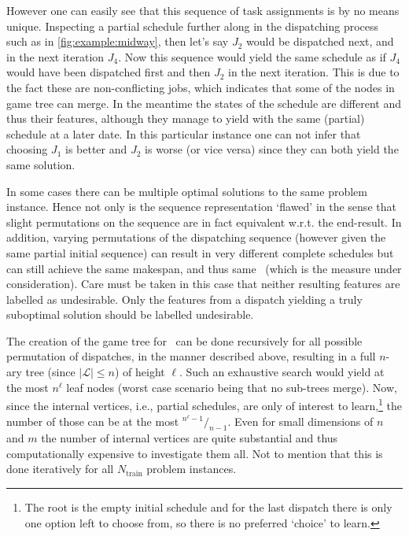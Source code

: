 However one can easily see that this sequence of task assignments is by no 
means unique. 
Inspecting a partial schedule further along in the dispatching process such as 
in \cref{fig:example:midway}, then let's say $J_2$ would be dispatched next, 
and in the next iteration $J_4$. 
Now this sequence would yield the same schedule as if $J_4$ would have been 
dispatched first and then $J_2$ in the next iteration. 
This is due to the fact these are non-conflicting jobs, which indicates that some of the nodes in game tree can merge. 
In the meantime the states of the schedule are different and thus their features, although they manage to yield with the same (partial) schedule at a later date.  %
In this particular instance one can not infer that choosing $J_1$ is better and $J_2$ is worse (or vice versa) since they can both yield the same solution.

In some cases there can be multiple optimal solutions to the same problem instance. 
Hence not only is the sequence representation `flawed' in the sense that slight permutations on the sequence are in fact equivalent w.r.t. the end-result.
In addition, varying permutations of the dispatching sequence (however given the same partial initial sequence) can result in very different complete schedules but can still achieve the same makespan, and thus same \fullnamerho\ (which is the measure under consideration). 
Care must be taken in this case that neither resulting features are labelled as undesirable. 
Only the features from a dispatch yielding a truly suboptimal solution should be labelled undesirable. 

The creation of the game tree for \jsp\ can be done recursively for all 
possible permutation of dispatches, in the manner described above, resulting in 
a full \mbox{$n$-ary} tree (since $|\mathcal{L}|\leq n$) of height $\ell$. Such 
an exhaustive search would yield at the most $n^{\ell}$ leaf nodes (worst case 
scenario being that no sub-trees merge). Now, since the internal vertices, 
i.e., partial schedules, are only of interest to learn,\footnote{The root is 
the empty initial schedule and for the last dispatch there is only one option 
left to choose from, so there is no preferred `choice' to learn.} the number of 
those can be at the most \mbox{${}^{n^{\ell}-1}/_{n-1}$}.
Even for small dimensions of $n$ and $m$ the number of internal vertices are quite substantial and thus computationally expensive to investigate them all. Not to mention that this is done iteratively for all $N_{\text{train}}$ problem instances.

